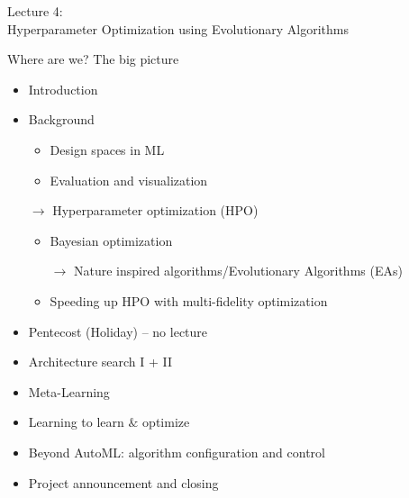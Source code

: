\begin{frame}[c]{}

\centering
\huge
Lecture 4:\\
Hyperparameter Optimization using Evolutionary Algorithms
\end{frame}
\begin{frame}[c]{Where are we? The big picture}

\begin{itemize}
	\item Introduction
	\item Background
	\begin{itemize}
		\item Design spaces in ML
		\item Evaluation and visualization
	\end{itemize}
	\item [$\to$] Hyperparameter optimization (HPO)
	\begin{itemize}
	  \item Bayesian optimization
	  \item [$\to$] Nature inspired algorithms/Evolutionary Algorithms (EAs) 
	  \item Speeding up HPO with multi-fidelity optimization
	\end{itemize}
	\item Pentecost (Holiday) -- no lecture
	\item Architecture search I + II
	\item Meta-Learning
	\item Learning to learn $\&$ optimize
	\item Beyond AutoML: algorithm configuration and control
	\item Project announcement and closing
\end{itemize}


\end{frame}

